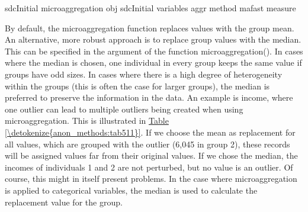 \documentclass[letterpaper,10pt,english]{sphinxmanual}
\begin{document}
\def\sphinxLiteralBlockLabel{\label{\detokenize{anon_methods:code516}}}
%
\begin{sphinxVerbatim}[commandchars=\\\{\},numbers=left,firstnumber=1,stepnumber=1]
 sdcInitial  microaggregation\PYGZbs{} obj  sdcInitial variables 
  aggr   method  mafast measure  
\end{sphinxVerbatim}

By default, the microaggregation function replaces values with the group
mean. An alternative, more robust approach is to replace group values
with the median. This can be specified in the argument  of the
function microaggregation(). In cases where the median is chosen, one
individual in every group keeps the same value if groups have odd sizes.
In cases where there is a high degree of heterogeneity within the groups
(this is often the case for larger groups), the median is preferred to
preserve the information in the data. An example is income, where one
outlier can lead to multiple outliers being created when using
microaggregation. This is illustrated in \hyperref[\detokenize{anon_methods:tab511}]{Table \ref{\detokenize{anon_methods:tab511}}}. If we choose the
mean as replacement for all values, which are grouped with the outlier
(6,045 in group 2), these records will be assigned values far from their
original values. If we chose the median, the incomes of individuals 1
and 2 are not perturbed, but no value is an outlier. Of course, this
might in itself present problems.  In the
case where microaggregation is applied to categorical variables, the
median is used to calculate the replacement value for the group.
\end{document}
